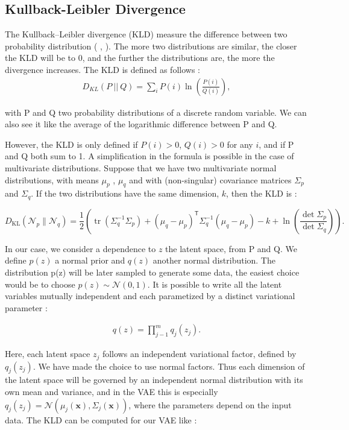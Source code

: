 \documentclass[11pt, english]{article}
\begin{document}
\subsection{Kullback-Leibler Divergence}


The Kullback–Leibler divergence (KLD) measure the difference between two probability distribution ( \cite{KL_1951}, \cite{K_1959} ).
The more two distributions are similar, the closer the KLD will be to 0, and the further the distributions are, the more the divergence increases. The KLD is defined as follows :
\begin{align}
D_{KL}(P \: || \: Q) = \sum_i P(i) \ln \left( \frac{P(i)}{Q(i)} \right) ,
\end{align}

with P and Q two probability distributions of a discrete random variable.
We can also see it like the average of the logarithmic difference between P and Q.

However, the KLD is only defined if $P(i) > 0$, $Q(i) > 0 $ for any $i$, and if P and Q both sum to 1.
A simplification in the formula is possible in the case of multivariate distributions.
Suppose that we have two multivariate normal distributions, with means
$\mu_p$ , $\mu_q$ and with (non-singular) covariance matrices $\Sigma_p$ and $\Sigma_q$.
 If the two distributions have the same dimension,
$k$, then the KLD is :

\begin{equation}
D_{\text{KL}}({\mathcal {N}}_{p}\parallel {\mathcal {N}}_{q})={\frac {1}{2}}\left(\operatorname {tr} \left(\Sigma _{q}^{-1}\Sigma _{p}\right)+(\mu _{q}-\mu _{p})^{\mathsf {T}}\Sigma _{q}^{-1}(\mu _{q}-\mu _{p})-k+\ln \left({\frac {\det \Sigma _{p}}{\det \Sigma _{q}}}\right)\right).
\end{equation}



In our case, we consider a dependence to $z$ the latent space, from P and Q. We define $p(z)$ a normal prior and $q(z)$ another normal distribution. The distribution p(z) will be later sampled to generate some data, the easiest choice would be to choose $p(z) \sim \mathcal{N}(0,1)$. It is possible to write all the latent variables mutually independent and each parametized by a distinct variational parameter \cite{rapport_stage_cyran}:

\begin{align}
    q(z) = \prod_{j-1}^{m}q_j(z_j).
\end{align}


Here, each latent space $z_j$ follows an independent variational factor, defined by $q_j(z_j)$. We have made the choice to use normal factors. Thus each dimension of the latent space will be governed by an independent normal distribution with its own mean and variance, and in the VAE this is especially $q_j(z_j) = \mathcal{N}( \mu_j (\textbf{x}), \Sigma_j(\textbf{x}))$, where the parameters depend on the input data. The KLD can be computed for our VAE like :
\end{document}
